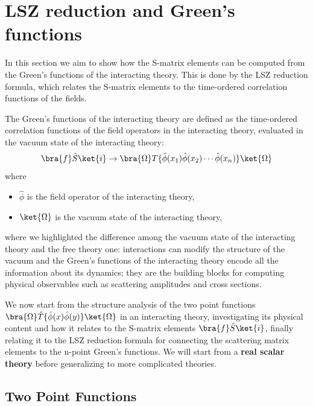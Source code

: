 \section{LSZ reduction and Green's functions}

In this section we aim to show how the S-matrix elements can be computed from the Green's functions of the interacting theory. This is done by the LSZ reduction formula, which relates the S-matrix elements to the time-ordered correlation functions of the fields.

The Green's functions of the interacting theory are defined as the time-ordered correlation functions of the field operators in the interacting theory, evaluated in the vacuum state of the interacting theory:
\begin{equation}
    \bra{f} \hat{S} \ket{i} \to \bra{\Omega} T \{ \hat{\phi}(x_1) \hat{\phi}(x_2) \cdots \hat{\phi}(x_n) \} \ket{\Omega}
    \label{eq:green_function_interacting}
\end{equation}
where
\begin{itemize}
    \item \(\hat{\phi}\) is the field operator of the interacting theory,
    \item \(\ket{\Omega}\) is the vacuum state of the interacting theory,
\end{itemize}
where we highlighted the difference among the vacuum state of the interacting theory and the free theory one: interactions can modify the structure of the vacuum and the Green's functions of the interacting theory encode all the information about its dynamics; they are the building blocks for computing physical observables such as scattering amplitudes and cross sections.

We now start from the structure analysis of the two point functions \(\bra{\Omega} \hat{T} \{ \hat{\phi}(x) \hat{\phi}(y) \} \ket{\Omega}\) in an interacting theory, investigating its physical content and how it relates to the S-matrix elements \( \bra{f} \hat{S} \ket{i} \), finally relating it to the LSZ reduction formula for connecting the scattering matrix elements to the n-point Green's functions. We will start from a \textbf{real scalar theory} before generalizing to more complicated theories.

\subsection{Two Point Functions}

